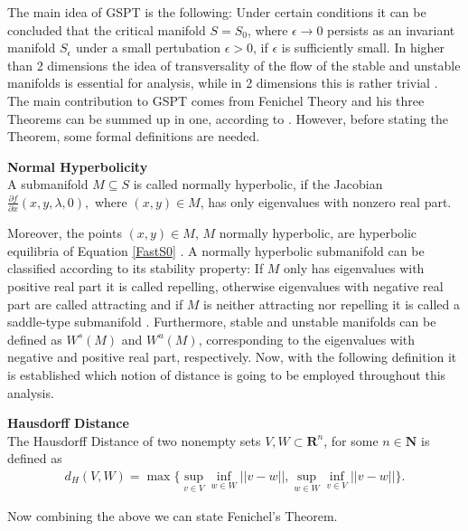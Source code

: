The main idea of GSPT is the following: Under certain conditions it can be concluded that the critical manifold $S=S_0$, where $\epsilon \to 0$ persists as an invariant manifold $S_{\epsilon}$ under a small pertubation $\epsilon >0$, if $\epsilon$ is sufficiently small. In higher than 2 dimensions the idea of transversality of the flow of the stable and unstable manifolds is essential for analysis, while in 2 dimensions this is rather trivial \citep{MMO}. The main contribution to GSPT comes from Fenichel Theory and his three Theorems can be summed up in one, according to \citep{MMO}.
However, before stating the Theorem, some formal definitions are needed.

\begin{definition}{\textbf{Normal Hyperbolicity \citep{firstpaper}}} \label{NormHyp}
	\\
	A submanifold $M \subseteq S$ is called normally hyperbolic, if the Jacobian $ \frac{\partial f}{\partial x}(x,y, \lambda, 0),$ where $(x,y) \in M$, has only eigenvalues with nonzero real part.
\end{definition} 

Moreover, the points $(x,y) \in M$, $M$ normally hyperbolic, are hyperbolic equilibria of Equation \ref{FastS0} \citep{MMO}.
A normally hyperbolic submanifold can be classified according to its stability property: If $M$ only has eigenvalues with positive real part it is called repelling, otherwise eigenvalues with negative real part are called attracting and if $M$ is neither attracting nor repelling it is called a saddle-type submanifold \citep{MMO}. Furthermore, stable and unstable manifolds can be defined as $W^s(M)$  and $W^u(M)$, corresponding to the eigenvalues with negative and positive real part, respectively. Now, with the following definition it is established which notion of distance is going to be employed throughout this analysis.

\begin{definition}{\textbf{Hausdorff Distance \citep{Kuehn}}}\\
	The Hausdorff Distance of two nonempty sets $V,W \subset \mathbf{R}^n$, for some $n \in \mathbf{N}$ 
	is defined as 
	\begin{align*}
	d_H(V,W)= \max \{ \sup_{v \in V} \inf_{w \in W} || v- w ||, \sup_ {w \in W}\inf_{v \in V} || v- w ||\}.
	\end{align*}
\end{definition}

Now combining the above we can state Fenichel's Theorem.

